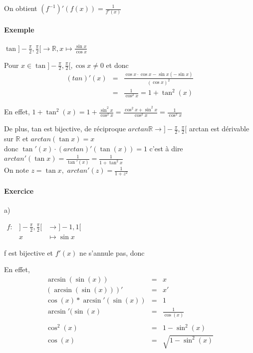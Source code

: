 On obtient $(f^{-1})'(f(x))=\frac{1}{f'(x)}$

\paragraph{Exemple} $\tan]-\frac{\pi}{2}, \frac{\pi}{2}[ \rightarrow \mathbb{R}, x\mapsto \frac{\sin x}{\cos x}$

Pour $x\in \tan]-\frac{\pi}{2},\frac{\pi}{2}[, \cos x \neq 0$ et donc \[
		\begin{array}{rcl}
			(tan)'(x) &=& \frac{\cos x \cdot \cos x - \sin x(-\sin x)}{(\cos x)^2} \\
										   &=& \frac{1}{\cos^2 x} = 1+\tan^2(x)
	\end{array}\]

	En effet, $1+\tan^2(x) = 1+\frac{\sin^2x}{\cos^2x} = \frac{\cos^2x+\sin^2x}{\cos^2x} = \frac{1}{\cos^2x}$

De plus, tan est bijective, de réciproque $arctan \mathbb{R} \rightarrow ]-\frac{\pi}{2}, \frac{\pi}{2}[$ arctan est dérivable sur $\mathbb{R}$ et $arctan(\tan x)=x$ ~\\
	donc $\tan'(x) \cdot (arctan)'(\tan(x)) = 1$ c'est à dire ~\\
	$arctan'(\tan x) = \frac{1}{\tan'(x)} = \frac{1}{1+\tan^2x}$ ~\\
	On note $z=\tan x, $ $arctan'(z) = \frac{1}{1+z^2}$

	\paragraph{Exercice} a)

$\begin{array}{rcl}
f:&]-\frac{\pi}{2}, \frac{\pi}{2}[&\rightarrow ]-1, 1[ \\
							 &x&\mapsto \sin x
\end{array}$

f est bijective et $f'(x)$ ne s'annule pas, donc ~\\
\begin{center}
	\fbox{$\forall x \in ]-1, 1[, \arcsin'(x) = \frac{1}{\sqrt{1-x^2}}$}
\end{center}

En effet, \[\begin{array}{rcl}
		\arcsin(\sin(x)) &=& x \\
		(\arcsin(\sin(x)))' &=& x' \\
		\cos(x) * \arcsin '(\sin(x)) &=& 1 \\
		\arcsin '(\sin(x) &=& \frac{1}{\cos(x)} \\
		\\
		\cos^2(x) &=& 1 - \sin^2(x) \\
		\cos(x) &=& \sqrt{1-\sin^2(x)}
\end{array}\]

